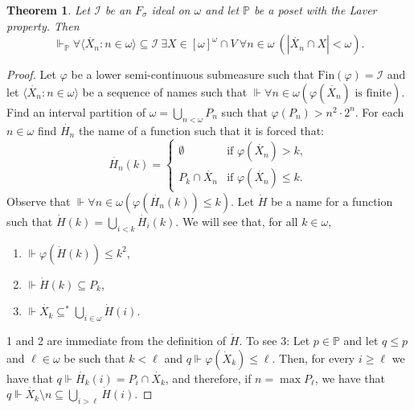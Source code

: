 \documentclass[a4paper,12pt]{amsart}
\newtheorem{thm}{Theorem}
\theoremstyle{definition}
\numberwithin{thm}{section}
\numberwithin{equation}{section}
\newcommand{\forces}{\Vdash}
\begin{document}
    \begin{thm}\label{thm:nonstaromega_is_small_in_Laver}
        Let $\mathscr{I}$ be an $F_\sigma$ ideal on $\omega$ and let $\mathbb{P}$ be a poset with the Laver property. Then
        \begin{equation}
            \label{eq:Laver_property}
            \forces_{\mathbb{P}} \forall \langle \dot{X_n} : n \in \omega \rangle \subseteq \mathscr{I}~\exists X \in [\omega]^\omega \cap V~\forall n \in \omega~(|\dot{X_n} \cap X | < \omega).
        \end{equation}
    \end{thm}
    \begin{proof}
        Let $\varphi$ be a lower semi-continuous submeasure such that $\mathrm{Fin}(\varphi) = \mathscr{I}$ and let $\langle \dot{X_n} : n \in \omega \rangle$ be a sequence of names such that $\forces{\forall n \in \omega (\varphi(\dot{X_n}) \text{ is finite})}$. Find an interval partition of $\omega = \bigcup_{n<\omega} P_n$ such that $\varphi(P_n) > n^2 \cdot 2^n$. For each $n \in \omega$ find $\dot{H_n}$ the name of a function such that it is forced that:
        $$
        \dot{H_n}(k) = \begin{cases}
        \emptyset & \text{if }\varphi(\dot{X_n}) > k,\\
        P_k \cap \dot{X_n} & \text{if }\varphi(\dot{X_n}) \leq k.
        \end{cases}
        $$
        Observe that $\forces{\forall n \in \omega (\varphi(\dot{H_n}(k)) \leq k)}$. Let $\dot{H}$ be a name for a function such that $\dot{H}(k) = \bigcup_{i < k} \dot{H_i}(k)$. We will see that, for all $k\in\omega$,
        \begin{enumerate}
            \item $\forces{\varphi(\dot{H}(k)) \leq k^2}$,
            \item $\forces{\dot{H}(k) \subseteq P_k}$,
            \item $\forces{\dot{X_k} \subseteq^* \bigcup_{i\in\omega}\dot{H}(i)}$.
        \end{enumerate}
        1 and 2 are immediate from the definition of $\dot{H}$. To see 3: Let $p \in \mathbb{P}$ and let $q \leq p$ and $\ell \in \omega$ be such that $k < \ell$ and $q\forces{\varphi(\dot{X}_k) \leq \ell}$. Then, for every $i \geq \ell$ we have that $q \forces{\dot{H_k}(i) = P_i \cap \dot{X_k}}$, and therefore, if $n = \max P_\ell$, we have that $q \forces{\dot{X_k} \setminus n \subseteq \bigcup_{i > \ell}\dot{H}(i)}$.
    

\end{proof}
\end{document}
